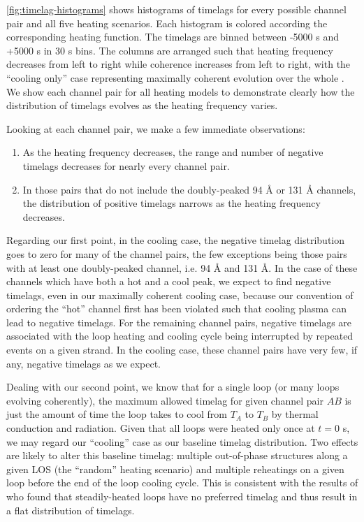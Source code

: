 \autoref{fig:timelag-histograms} shows histograms of timelags for every possible channel pair and all five heating scenarios. Each histogram is colored according the corresponding heating function. The timelags are binned between -5000 s and +5000 s in 30 s bins. The columns are arranged such that heating frequency decreases from left to right while coherence increases from left to right, with the ``cooling only'' case representing maximally coherent evolution over the whole \AR{}. We show each channel pair for all heating models to demonstrate clearly how the distribution of timelags evolves as the heating frequency varies.

Looking at each channel pair, we make a few immediate observations: 
\begin{enumerate}
\item As the heating frequency decreases, the range and number of negative timelags decreases for nearly every channel pair.
\item In those pairs that do not include the doubly-peaked 94 \AA{} or 131 \AA{} channels, the distribution of positive timelags narrows as the heating frequency decreases.
\end{enumerate}

Regarding our first point, in the cooling case, the negative timelag distribution goes to zero for many of the channel pairs, the few exceptions being those pairs with at least one doubly-peaked channel, i.e. 94 \AA{} and 131 \AA{}. In the case of these channels which have both a hot and a cool peak, we expect to find negative timelags, even in our maximally coherent cooling case, because our convention of ordering the ``hot'' channel first has been violated such that cooling plasma can lead to negative timelags. For the remaining channel pairs, negative timelags are associated with the loop heating and cooling cycle being interrupted by repeated events on a given strand. In the cooling case, these channel pairs have very few, if any, negative timelags as we expect. 

Dealing with our second point, we know that for a single loop (or many loops evolving coherently), the maximum allowed timelag for given channel pair $AB$ is just the amount of time the loop takes to cool from $T_A$ to $T_B$ by thermal conduction and radiation. Given that all loops were heated only once at $t=0$ s, we may regard our ``cooling'' case as our baseline timelag distribution. Two effects are likely to alter this baseline timelag: multiple out-of-phase structures along a given LOS (the ``random'' heating scenario) and multiple reheatings on a given loop before the end of the loop cooling cycle. This is consistent with the results of \citet{viall_signatures_2016} who found that steadily-heated loops have no preferred timelag and thus result in a flat distribution of timelags. 

